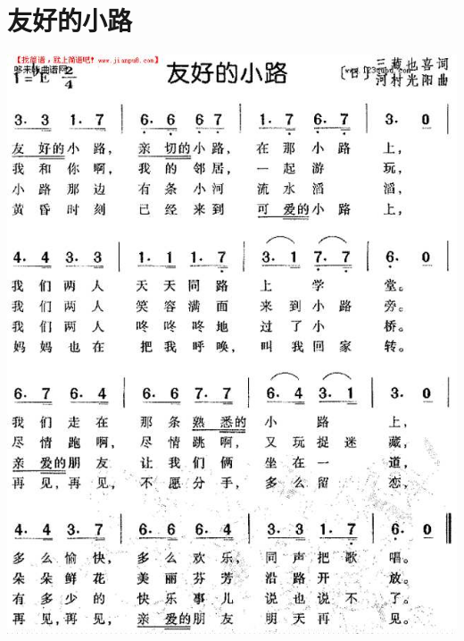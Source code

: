 \documentclass[cn,pad,chinesefont=nofont]{elegantbook}
\begin{document}
\section{友好的小路}
	\includegraphics[width=\textwidth]{dongxiao/20200628-日本-友好的小路}  
\end{document}
